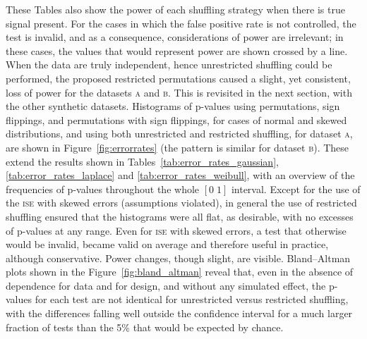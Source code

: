 These Tables also show the power of each shuffling strategy when there is true signal present. For the cases in which the false positive rate is not controlled, the test is invalid, and as a consequence, considerations of power are irrelevant; in these cases, the values that would represent power are shown crossed by a line. When the data are truly independent, hence unrestricted shuffling could be performed, the proposed restricted permutations caused a slight, yet consistent, loss of power for the datasets \textsc{a} and \textsc{b}. This is revisited in the next section, with the other synthetic datasets. Histograms of p-values using permutations, sign flippings, and permutations with sign flippings, for cases of normal and skewed distributions, and using both unrestricted and restricted shuffling, for dataset \textsc{a}, are shown in Figure~\ref{fig:errorrates} (the pattern is similar for dataset \textsc{b}). These extend the results shown in Tables~\ref{tab:error_rates_gaussian}, \ref{tab:error_rates_laplace} and \ref{tab:error_rates_weibull}, with an overview of the frequencies of p-values throughout the whole $[0\; 1]$ interval. Except for the use of the \textsc{ise} with skewed errors (assumptions violated), in general the use of restricted shuffling ensured that the histograms were all flat, as desirable, with no excesses of p-values at any range. Even for \textsc{ise} with skewed errors, a test that otherwise would be invalid, became valid on average and therefore useful in practice, although conservative. Power changes, though slight, are visible. Bland--Altman plots shown in the Figure~\ref{fig:bland_altman} reveal that, even in the absence of dependence for data and for design, and without any simulated effect, the p-values for each test are not identical for unrestricted versus restricted shuffling, with the differences falling well outside the confidence interval for a much larger fraction of tests than the 5\% that would be expected by chance.

